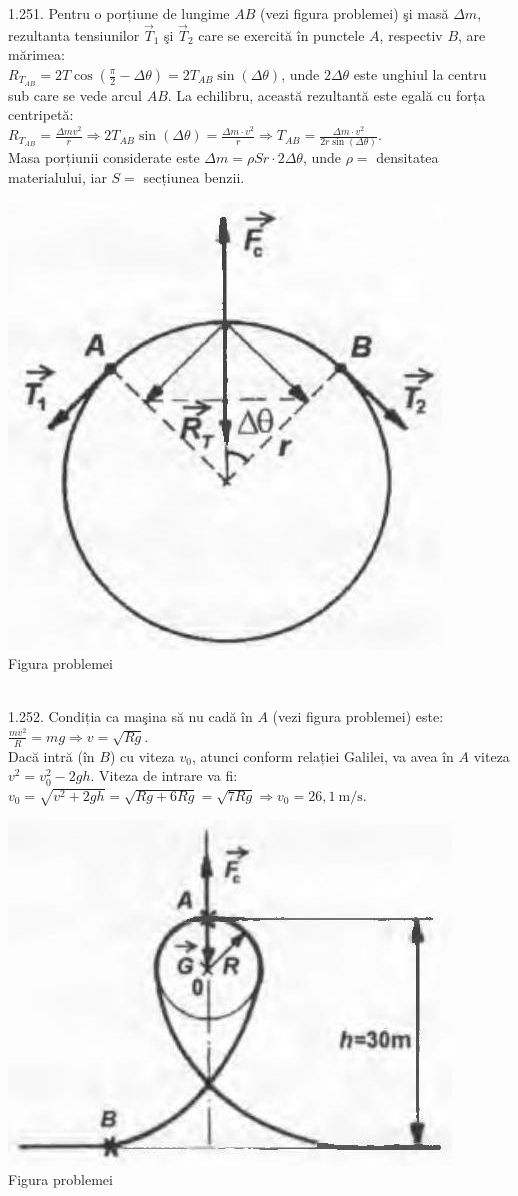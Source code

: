 1.251. Pentru o porțiune de lungime $AB$ (vezi figura problemei) şi masă $\Delta m$, rezultanta tensiunilor $\vec{T}_{1}$ şi $\vec{T}_{2}$ care se exercită în punctele $A$, respectiv $B$, are mărimea:\\ $R_{T_{AB}}=2 T \cos \left(\frac{\pi}{2}-\Delta \theta\right)=2 T_{AB} \sin (\Delta \theta)$, unde $2 \Delta \theta$ este unghiul la centru sub care se vede arcul ${AB}$. La echilibru, această rezultantă este egală cu forța centripetă:\\ $R_{T_{AB}}=\frac{\Delta m v^{2}}{r} \Rightarrow 2 T_{AB} \sin (\Delta \theta)=\frac{\Delta m \cdot v^{2}}{r} \Rightarrow T_{AB}=\frac{\Delta m \cdot v^{2}}{2 r \sin (\Delta \theta)}$.\\ Masa porțiunii considerate este $\Delta m=\rho S r \cdot 2 \Delta \theta$, unde $\rho=$ densitatea materialului, iar $S=$ secțiunea benzii.\\ \begin{center} \includegraphics[width=0.4\linewidth]{images/2025_07_01_5b3ff9fa0d508c8e9f17g-251}\\ Figura problemei \end{center}\\

1.252. Condiția ca maşina să nu cadă în $A$ (vezi figura problemei) este:\\ $\frac{m v^{2}}{R}=m g \Rightarrow v=\sqrt{R g}$.\\ Dacă intră (în $B$) cu viteza $v_{0}$, atunci conform relației Galilei, va avea în $A$ viteza $v^{2}=v_{0}^{2}-2 g h$. Viteza de intrare va fi:\\ $v_{0}=\sqrt{v^{2}+2 g h}=\sqrt{R g+6 R g}=\sqrt{7 R g} \Rightarrow v_{0}=26,1 \mathrm{~m} / \mathrm{s}$.\\ \begin{center} \includegraphics[width=0.4\linewidth]{images/2025_07_01_5b3ff9fa0d508c8e9f17g-252(1)}\\ Figura problemei \end{center}\\


